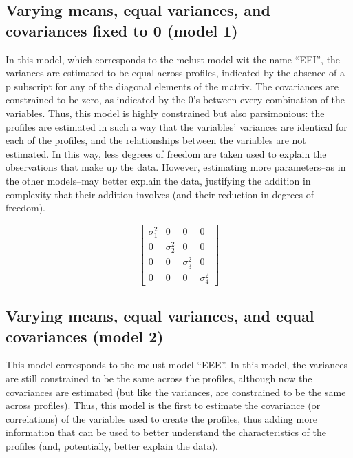 \documentclass[]{msu-thesis}
\theoremstyle{definition}
\theoremstyle{definition}
\theoremstyle{definition}
\theoremstyle{remark}
\begin{document}
\subsection{Varying means, equal variances, and covariances fixed to 0
(model
1)}\label{varying-means-equal-variances-and-covariances-fixed-to-0-model-1}

In this model, which corresponds to the mclust model wit the name
``EEI'', the variances are estimated to be equal across profiles,
indicated by the absence of a p subscript for any of the diagonal
elements of the matrix. The covariances are constrained to be zero, as
indicated by the 0's between every combination of the variables. Thus,
this model is highly constrained but also parsimonious: the profiles are
estimated in such a way that the variables' variances are identical for
each of the profiles, and the relationships between the variables are
not estimated. In this way, less degrees of freedom are taken used to
explain the observations that make up the data. However, estimating more
parameters--as in the other models--may better explain the data,
justifying the addition in complexity that their addition involves (and
their reduction in degrees of freedom).

\[
\left[ \begin{matrix} { \sigma }_{ 1 }^{ 2 } & 0 & 0 & 0 \\ 0 & { \sigma }_{ 2 }^{ 2 } & 0 & 0 \\ 0 & 0 & { \sigma }_{ 3 }^{ 2 } & 0 \\ 0 & 0 & 0 & { \sigma }_{ 4 }^{ 2 } \end{matrix} \right]
\]

\subsection{Varying means, equal variances, and equal covariances (model
2)}\label{varying-means-equal-variances-and-equal-covariances-model-2}

This model corresponds to the mclust model ``EEE''. In this model, the
variances are still constrained to be the same across the profiles,
although now the covariances are estimated (but like the variances, are
constrained to be the same across profiles). Thus, this model is the
first to estimate the covariance (or correlations) of the variables used
to create the profiles, thus adding more information that can be used to
better understand the characteristics of the profiles (and, potentially,
better explain the data).
\end{document}
